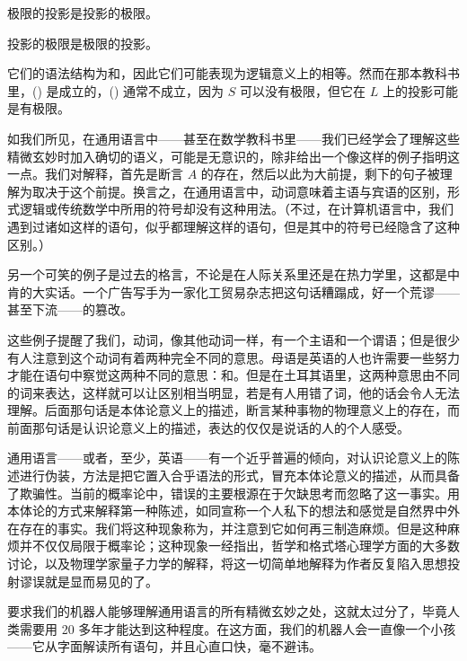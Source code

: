 \startitemize[R]
\item 极限的投影是投影的极限。
\item 投影的极限是极限的投影。
\stopitemize

它们的语法结构为和，因此它们可能表现为逻辑意义上的相等。然而在那本教科书里，() 是成立的，() 通常不成立，因为 $S$ 可以没有极限，但它在 $L$ 上的投影可能是有极限。

如我们所见，在通用语言中——甚至在数学教科书里——我们已经学会了理解这些精微玄妙时加入确切的语义，可能是无意识的，除非给出一个像这样的例子指明这一点。我们对解释，首先是断言 $A$ 的存在，然后以此为大前提，剩下的句子被理解为取决于这个前提。换言之，在通用语言中，动词意味着主语与宾语的区别，形式逻辑或传统数学中所用的符号\quotation{=}却没有这种用法。（不过，在计算机语言中，我们遇到过诸如这样的语句，似乎都理解这样的语句，但是其中的符号\quotation{=}已经隐含了这种区别。）

另一个可笑的例子是过去的格言，不论是在人际关系里还是在热力学里，这都是中肯的大实话。一个广告写手为一家化工贸易杂志把这句话糟蹋成，好一个荒谬——甚至下流——的篡改。

这些例子提醒了我们，动词，像其他动词一样，有一个主语和一个谓语；但是很少有人注意到这个动词有着两种完全不同的意思。母语是英语的人也许需要一些努力才能在语句中察觉这两种不同的意思：和。但是在土耳其语里，这两种意思由不同的词来表达，这样就可以让区别相当明显，若是有人用错了词，他的话会令人无法理解。后面那句话是本体论意义上的描述，断言某种事物的物理意义上的存在，而前面那句话是认识论意义上的描述，表达的仅仅是说话的人的个人感受。

通用语言——或者，至少，英语——有一个近乎普遍的倾向，对认识论意义上的陈述进行伪装，方法是把它置入合乎语法的形式，冒充本体论意义的描述，从而具备了欺骗性。当前的概率论中，错误的主要根源在于欠缺思考而忽略了这一事实。用本体论的方式来解释第一种陈述，如同宣称一个人私下的想法和感觉是自然界中外在存在的事实。我们将这种现象称为，并注意到它如何再三制造麻烦。但是这种麻烦并不仅仅局限于概率论；这种现象一经指出，哲学和格式塔心理学方面的大多数讨论，以及物理学家量子力学的解释，将这一切简单地解释为作者反复陷入思想投射谬误就是显而易见的了。

要求我们的机器人能够理解通用语言的所有精微玄妙之处，这就太过分了，毕竟人类需要用 20 多年才能达到这种程度。在这方面，我们的机器人会一直像一个小孩——它从字面解读所有语句，并且心直口快，毫不避讳。

